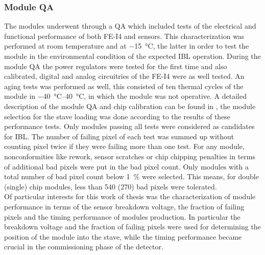 \subsubsection{Module QA }
The modules underwent through a QA which included tests of the electrical and functional performance of both FE-I4 and sensors. This characterization was performed at room temperature and at \SI{-15}{\celsius}, the latter in order to test the module in the environmental condition of the expected IBL operation.
During the module QA the power regulators were tested for the first time and also calibrated, digital and analog circuitries of the FE-I4 were as well tested. An aging tests was performed as well, this consisted of ten thermal cycles of the module in \SIrange{-40}{40}{\celsius}, in which the module was not operative. 
A detailed description of the module QA and chip calibration can be found in \cite{Malte_thesis}, the module selection for the stave loading was done according to the results of these performance tests. Only modules passing all tests were considered as candidates for IBL. The number of failing pixel of each test was summed up without counting pixel twice if they were failing more than one test. For any module, nonconformities like rework, sensor scratches or chip chipping penalties in terms of additional bad pixels were put in the bad pixel count. Only modules with a total number of bad pixel count below \SI{1}{\percent} were selected. This means, for double (single) chip modules, less than 540 (270) bad pixels were tolerated.\\
Of particular interests for this work of thesis was the characterization of module performance in terms of the sensor breakdown voltage, the fraction of failing pixels and the timing performance of modules production. In particular the breakdown voltage and the fraction of failing pixels were used for determining the position of the module into the stave, while the timing performance became crucial in the commissioning phase of the detector.\\
